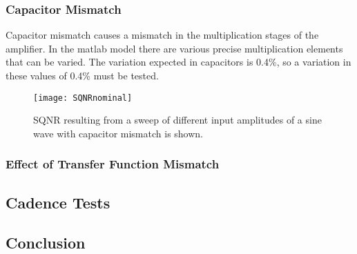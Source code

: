         \subsubsection{Capacitor Mismatch}
        Capacitor mismatch causes a mismatch in the multiplication stages of the amplifier.
        In the matlab model there are various precise multiplication elements that can be varied.
        The variation expected in capacitors is 0.4\%, so a variation in these values of 0.4\% must be tested.
 
        \begin{figure}
            \begin{center}
            \texttt{[image: SQNRnominal]}
            \label{fig:SQNRcap}
            \caption{SQNR resulting from a sweep of different input amplitudes of a sine wave with capacitor mismatch is shown.}
            \end{center}
        \end{figure}             

        \subsubsection{Effect of Transfer Function Mismatch} 
        

    \subsection{Cadence Tests}

\subsection{Conclusion}
\label{Verification:conclusion}

